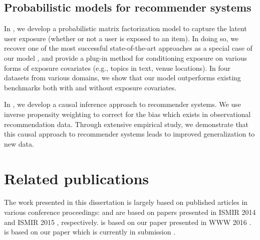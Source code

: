 \subsection{Probabilistic models for recommender systems}
In , we develop a probabilistic matrix factorization model to capture the latent user exposure (whether or not a user is exposed to an item). In doing so, we recover one of the most successful state-of-the-art approaches as a special case of our model
\citep{hu2008collaborative}, and provide a plug-in method for conditioning
exposure on various forms of exposure covariates (e.g., topics in text,
venue locations). In four datasets from various domains, we show that our model
outperforms existing benchmarks both with and
without exposure covariates. 

In , we develop a causal inference approach to recommender systems. 
We use inverse propensity weighting to correct for the bias which exists in observational recommendation data. Through extensive empirical study, we demonstrate that this causal approach to recommender systems leads to improved generalization to new data.


\section{Related publications}

The work presented in this dissertation is largely based on published articles in various conference proceedings:  and  are based on papers presented in ISMIR 2014 \citep{liang2014codebook} and ISMIR 2015 \citep{liang15content}, respectively.  is based on our paper presented in WWW 2016 \citep{Liang16exposure}.  is based on our paper which is currently in submission \citep{liang16causal}.